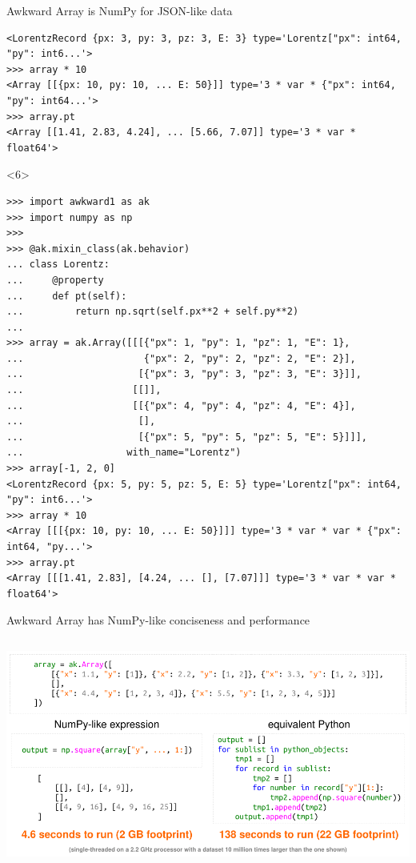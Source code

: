 \documentclass[aspectratio=169]{beamer}
\begin{document}
\begin{frame}[fragile]{Awkward Array is NumPy for JSON-like data}
\begin{onlyenv}
\begin{verbatim}
<LorentzRecord {px: 3, py: 3, pz: 3, E: 3} type='Lorentz["px": int64, "py": int6...'>
>>> array * 10
<Array [[{px: 10, py: 10, ... E: 50}]] type='3 * var * {"px": int64, "py": int64...'>
>>> array.pt
<Array [[1.41, 2.83, 4.24], ... [5.66, 7.07]] type='3 * var * float64'>
\end{verbatim}
\vspace{3 cm}
\end{onlyenv}
\begin{onlyenv}<6>
\begin{verbatim}
>>> import awkward1 as ak
>>> import numpy as np
>>> 
>>> @ak.mixin_class(ak.behavior)
... class Lorentz:
...     @property
...     def pt(self):
...         return np.sqrt(self.px**2 + self.py**2)
... 
>>> array = ak.Array([[[{"px": 1, "py": 1, "pz": 1, "E": 1},
...                     {"px": 2, "py": 2, "pz": 2, "E": 2}],
...                    [{"px": 3, "py": 3, "pz": 3, "E": 3}]],
...                   [[]],
...                   [[{"px": 4, "py": 4, "pz": 4, "E": 4}],
...                    [],
...                    [{"px": 5, "py": 5, "pz": 5, "E": 5}]]],
...                  with_name="Lorentz")
>>> array[-1, 2, 0]
<LorentzRecord {px: 5, py: 5, pz: 5, E: 5} type='Lorentz["px": int64, "py": int6...'>
>>> array * 10
<Array [[[{px: 10, py: 10, ... E: 50}]]] type='3 * var * var * {"px": int64, "py...'>
>>> array.pt
<Array [[[1.41, 2.83], [4.24, ... [], [7.07]]] type='3 * var * var * float64'>
\end{verbatim}
\vspace{3 cm}
\end{onlyenv}
\end{frame}

\begin{frame}{Awkward Array has NumPy-like conciseness and performance}
\vspace{0.2 cm}
\begin{columns}
\includegraphics[width=\linewidth]{pivarski-one-slide-summary.pdf}
\end{columns}
\end{frame}
\end{document}
